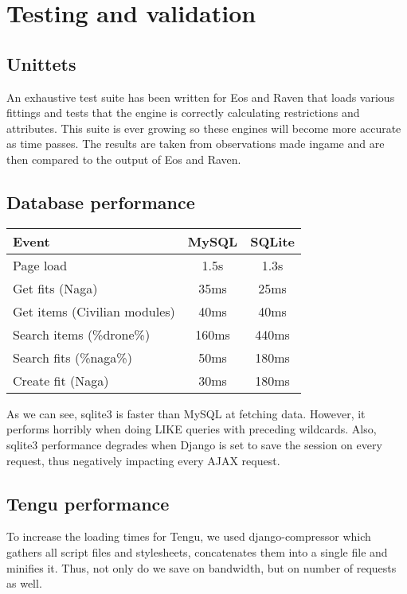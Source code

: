 \chapter{Testing and validation}

\section{Unittets}
An exhaustive test suite has been written for Eos and Raven that loads various fittings and tests that the engine is correctly calculating restrictions and attributes. This suite is ever growing so these engines will become more accurate as time passes. The results are taken from observations made ingame and are then compared to the output of Eos and Raven.

\section{Database performance}
\begin{table}[h]
\centering
\begin{tabular}{|l|c|c|}
\hline Event & MySQL & SQLite \\ 
\hline Page load & 1.5s & 1.3s \\ 
\hline Get fits (Naga) & 35ms & 25ms \\ 
\hline Get items (Civilian modules) & 40ms & 40ms \\ 
\hline Search items (\%drone\%) & 160ms & 440ms \\ 
\hline Search fits (\%naga\%) & 50ms & 180ms \\ 
\hline Create fit (Naga) & 30ms & 180ms \\ 
\hline 
\end{tabular} 
\end{table}

As we can see, sqlite3 is faster than MySQL at fetching data. However, it performs horribly when doing LIKE queries with preceding wildcards. Also, sqlite3 performance degrades when Django is set to save the session on every request, thus negatively impacting every AJAX request.

\section{Tengu performance}
To increase the loading times for Tengu, we used django-compressor \cite{compressor} which gathers all script files and stylesheets, concatenates them into a single file and minifies it. Thus, not only do we save on bandwidth, but on number of requests as well.


